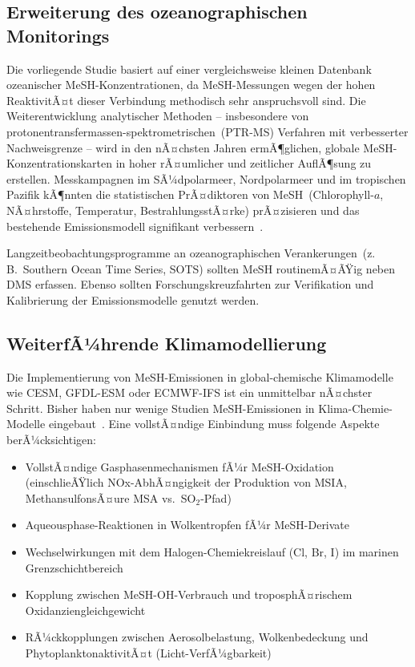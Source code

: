 ﻿\documentclass[a4paper,12pt]{article}
\theoremstyle{definition}
\begin{document}
\subsection{Erweiterung des ozeanographischen Monitorings}

Die vorliegende Studie basiert auf einer vergleichsweise kleinen Datenbank ozeanischer
MeSH-Konzentrationen, da MeSH-Messungen wegen der hohen ReaktivitÃ¤t dieser Verbindung
methodisch sehr anspruchsvoll sind. Die Weiterentwicklung analytischer Methoden -- insbesondere
von protonentransfermassen-spektrometrischen~(PTR-MS) Verfahren mit verbesserter Nachweisgrenze --
wird in den nÃ¤chsten Jahren ermÃ¶glichen, globale MeSH-Konzentrationskarten in hoher rÃ¤umlicher
und zeitlicher AuflÃ¶sung zu erstellen. Messkampagnen im SÃ¼dpolarmeer, Nordpolarmeer und im
tropischen Pazifik kÃ¶nnten die statistischen PrÃ¤diktoren von MeSH~(Chlorophyll-$a$, NÃ¤hrstoffe,
Temperatur, BestrahlungsstÃ¤rke) prÃ¤zisieren und das bestehende Emissionsmodell signifikant
verbessern~\cite{wohl2024, kettle1999}.

Langzeitbeobachtungsprogramme an ozeanographischen Verankerungen~(z.\,B.\ Southern Ocean
Time Series, SOTS) sollten MeSH routinemÃ¤ÃŸig neben DMS erfassen. Ebenso sollten
Forschungskreuzfahrten zur Verifikation und Kalibrierung der Emissionsmodelle genutzt werden.

\subsection{WeiterfÃ¼hrende Klimamodellierung}

Die Implementierung von MeSH-Emissionen in global-chemische Klimamodelle wie CESM, GFDL-ESM
oder ECMWF-IFS ist ein unmittelbar nÃ¤chster Schritt. Bisher haben nur wenige Studien
MeSH-Emissionen in Klima-Chemie-Modelle eingebaut~\cite{wohl2024, pham2005}. Eine vollstÃ¤ndige
Einbindung muss folgende Aspekte berÃ¼cksichtigen:

\begin{itemize}
  \item VollstÃ¤ndige Gasphasenmechanismen fÃ¼r MeSH-Oxidation (einschlieÃŸlich NOx-AbhÃ¤ngigkeit
        der Produktion von MSIA, MethansulfonsÃ¤ure MSA vs.\ SO$_2$-Pfad)
  \item Aqueousphase-Reaktionen in Wolkentropfen fÃ¼r MeSH-Derivate
  \item Wechselwirkungen mit dem Halogen-Chemiekreislauf (Cl, Br, I) im marinen Grenzschichtbereich
  \item Kopplung zwischen MeSH-OH-Verbrauch und troposphÃ¤rischem Oxidanziengleichgewicht
  \item RÃ¼ckkopplungen zwischen Aerosolbelastung, Wolkenbedeckung und PhytoplanktonaktivitÃ¤t
        (Licht-VerfÃ¼gbarkeit)
\end{itemize}
\end{document}
